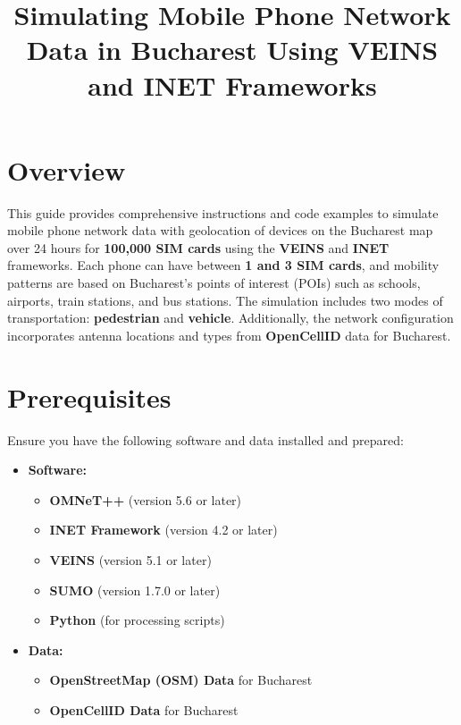 \documentclass{article}
\begin{document}
	
	\title{Simulating Mobile Phone Network Data in Bucharest Using VEINS and INET Frameworks}
	\author{}
	\date{}
	
	\maketitle
	
	\tableofcontents
	\newpage
	
	\section{Overview}
	
	This guide provides comprehensive instructions and code examples to simulate mobile phone network data with geolocation of devices on the Bucharest map over 24 hours for \textbf{100,000 SIM cards} using the \textbf{VEINS} and \textbf{INET} frameworks. Each phone can have between \textbf{1 and 3 SIM cards}, and mobility patterns are based on Bucharest's points of interest (POIs) such as schools, airports, train stations, and bus stations. The simulation includes two modes of transportation: \textbf{pedestrian} and \textbf{vehicle}. Additionally, the network configuration incorporates antenna locations and types from \textbf{OpenCellID} data for Bucharest.
	
	\section{Prerequisites}
	
	Ensure you have the following software and data installed and prepared:
	
	\begin{itemize}
		\item \textbf{Software:}
		\begin{itemize}
			\item \textbf{OMNeT++} (version 5.6 or later)
			\item \textbf{INET Framework} (version 4.2 or later)
			\item \textbf{VEINS} (version 5.1 or later)
			\item \textbf{SUMO} (version 1.7.0 or later)
			\item \textbf{Python} (for processing scripts)
		\end{itemize}
		\item \textbf{Data:}
		\begin{itemize}
			\item \textbf{OpenStreetMap (OSM) Data} for Bucharest
			\item \textbf{OpenCellID Data} for Bucharest
		\end{itemize}
	\end{itemize}
	
\end{document}
